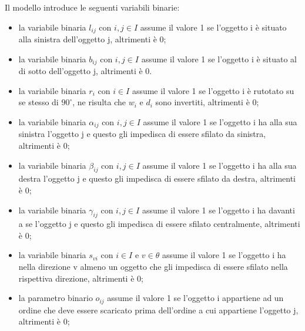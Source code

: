 Il modello introduce le seguenti variabili binarie:
\begin{itemize}
	\item la variabile binaria $l_{ij}$ con $i,j \in I$ assume il valore 1 se l'oggetto i è situato alla sinistra dell'oggetto j, altrimenti è 0;
	\item la variabile binaria $b_{ij}$ con $i,j \in I$ assume il valore 1 se l'oggetto i è situato al di sotto dell'oggetto j, altrimenti è 0.
	\item la variabile binaria $r_{i}$ con $i \in I$ assume il valore 1 se l'oggetto i è rutotato su se stesso di $90^{\circ}$, ne risulta che $w_{i}$ e $d_{i}$ sono invertiti, altrimenti è 0;
	\item la variabile binaria $\alpha_{ij}$ con $i,j \in I$ assume il valore 1 se l'oggetto i ha alla sua sinistra l'oggetto j e questo gli impedisca di essere sfilato da sinistra, altrimenti è 0;
	\item la variabile binaria $\beta_{ij}$ con $i,j \in I$ assume il valore 1 se l'oggetto i ha alla sua destra l'oggetto j e questo gli impedisca di essere sfilato da destra, altrimenti è 0;
	\item la variabile binaria $\gamma_{ij}$ con $i,j \in I$ assume il valore 1 se l'oggetto i ha davanti a se l'oggetto j e questo gli impedisca di essere sfilato centralmente, altrimenti è 0;
	\item la variabile binaria $s_{vi}$ con $i \in I$ e $v \in \theta$ assume il valore 1 se l'oggetto i ha nella direzione v almeno un oggetto che gli impedisca di essere sfilato nella rispettiva direzione, altrimenti è 0;
	\item la parametro binario $o_{ij}$ assume il valore 1 se l'oggetto i appartiene ad un ordine che deve essere scaricato prima dell'ordine a cui appartiene l'oggetto j, altrimenti è 0;
\end{itemize}

